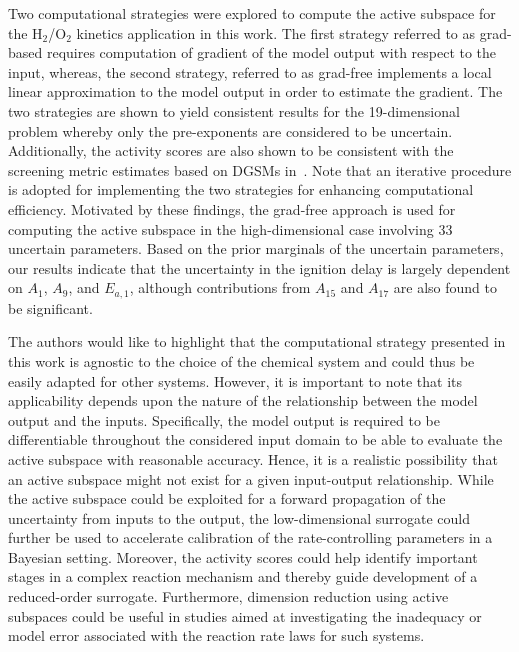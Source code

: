 Two computational strategies were explored to compute the active subspace for the H$_2$/O$_2$
kinetics application in this work. The first strategy referred to as grad-based requires computation of gradient of the 
model output with respect to the input, whereas, the second strategy, referred to as grad-free implements a local
linear approximation to the model output in order to estimate the gradient. The two strategies are shown to yield
consistent results for the 19-dimensional problem whereby only the pre-exponents are considered to be uncertain.
Additionally, the activity scores are also shown to be consistent with the screening metric estimates based on
DGSMs in~\cite{Vohra:2018}. Note that an iterative procedure is adopted for implementing the two strategies
for enhancing computational efficiency. 
Motivated by these findings, the grad-free approach is used for computing the active subspace in the high-dimensional
case involving 33 uncertain parameters. Based on the prior marginals of the uncertain parameters, our results
indicate that the uncertainty in the ignition delay is largely dependent on $A_1$, $A_9$, and $E_{a,1}$, although
 contributions from $A_{15}$ and $A_{17}$ are also found to be significant. 
 
 The authors would like to highlight that the computational strategy presented in this work is agnostic to the choice
 of the chemical system and could thus be easily adapted for other systems. However, it is important to note that
 its applicability depends upon the nature of the relationship between the model output and the inputs. Specifically,
 the model output is required to be differentiable throughout the considered input domain to be able to evaluate
 the active subspace with reasonable accuracy. Hence, it is a realistic possibility that an active subspace might not
 exist for a given input-output relationship. While the active subspace could be exploited for a forward propagation of
 the uncertainty from inputs to the output, the low-dimensional surrogate could further be used to accelerate 
 calibration of the rate-controlling parameters in a Bayesian setting. Moreover, the activity scores could help
 identify important stages in a complex reaction mechanism and thereby guide development of a reduced-order
 surrogate. Furthermore, dimension reduction using active subspaces could be useful in studies aimed at
 investigating the inadequacy or model error associated with the reaction rate laws for such systems.  
 
 
 
 
 
 
 